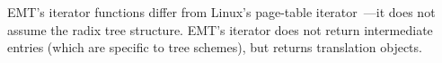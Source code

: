 EMT's iterator functions differ from Linux's page-table iterator~\cite{linux:pt-iter}---it does not assume the radix tree structure.
EMT's iterator does not return intermediate entries (which are specific to tree schemes),
	but returns translation objects. %





	



		

